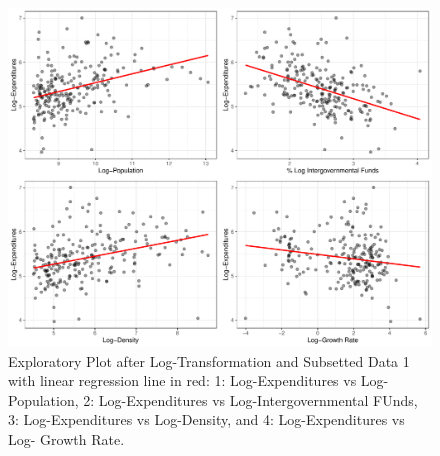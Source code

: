 \documentclass[11pt]{article}\usepackage[]{graphicx}\usepackage[]{color}
\makeatletter
\def\maxwidth{ %
  \ifdim\Gin@nat@width>\linewidth
    \linewidth
  \else
    \Gin@nat@width
  \fi
}
\makeatother
\begin{document}
\begin{figure}[h!] 
\begin{center}

\includegraphics[width=\maxwidth]{figure/unnamed-chunk-7-1} 

\caption{Exploratory Plot after Log-Transformation and Subsetted Data 1 with linear regression line in red: 1: Log-Expenditures vs Log-Population, 2: Log-Expenditures vs Log-Intergovernmental FUnds, 3: Log-Expenditures vs Log-Density, and 4: Log-Expenditures vs Log- Growth Rate.}
\label{sec2-explore}
\end{center} 
\end{figure}
\end{document}
